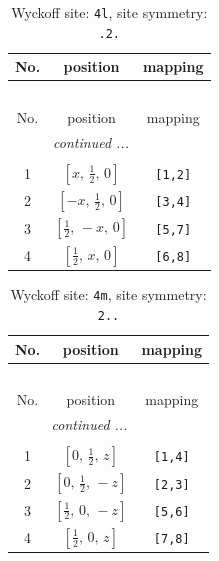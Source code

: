\documentclass[fleqn,8pt]{jsarticle}
\begin{document}
\renewcommand{\arraystretch}{1.2}
\begin{longtable}{ccc}
\caption{Wyckoff site: {\tt 4l}, site symmetry: {\tt .2.}}
 \\
 \hline \hline
No. & position & mapping \\ \hline \endfirsthead

\multicolumn{2}{l}{\tablename\ \thetable{}} \\
 \hline \hline
No. & position & mapping \\ \hline \endhead

 \hline \hline
\multicolumn{2}{r}{\footnotesize\it continued ...} \\ \endfoot

 \hline \hline
\multicolumn{2}{r}{} \\ \endlastfoot

1 & $\left[ x,\, \frac{1}{2},\, 0 \right]$ & {\tt [1,2]} \\ \hline
2 & $\left[ - x,\, \frac{1}{2},\, 0 \right]$ & {\tt [3,4]} \\ \hline
3 & $\left[ \frac{1}{2},\, - x,\, 0 \right]$ & {\tt [5,7]} \\ \hline
4 & $\left[ \frac{1}{2},\, x,\, 0 \right]$ & {\tt [6,8]} \\
\end{longtable}
\renewcommand{\arraystretch}{1.2}
\begin{longtable}{ccc}
\caption{Wyckoff site: {\tt 4m}, site symmetry: {\tt 2..}}
 \\
 \hline \hline
No. & position & mapping \\ \hline \endfirsthead

\multicolumn{2}{l}{\tablename\ \thetable{}} \\
 \hline \hline
No. & position & mapping \\ \hline \endhead

 \hline \hline
\multicolumn{2}{r}{\footnotesize\it continued ...} \\ \endfoot

 \hline \hline
\multicolumn{2}{r}{} \\ \endlastfoot

1 & $\left[ 0,\, \frac{1}{2},\, z \right]$ & {\tt [1,4]} \\ \hline
2 & $\left[ 0,\, \frac{1}{2},\, - z \right]$ & {\tt [2,3]} \\ \hline
3 & $\left[ \frac{1}{2},\, 0,\, - z \right]$ & {\tt [5,6]} \\ \hline
4 & $\left[ \frac{1}{2},\, 0,\, z \right]$ & {\tt [7,8]} \\
\end{longtable}
\end{document}
